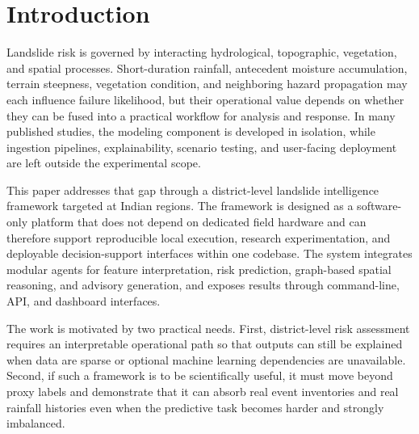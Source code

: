 \documentclass[pdflatex,sn-mathphys-num]{sn-jnl}
\begin{document}

\maketitle

\section{Introduction}

Landslide risk is governed by interacting hydrological, topographic, vegetation, and spatial processes. Short-duration rainfall, antecedent moisture accumulation, terrain steepness, vegetation condition, and neighboring hazard propagation may each influence failure likelihood, but their operational value depends on whether they can be fused into a practical workflow for analysis and response. In many published studies, the modeling component is developed in isolation, while ingestion pipelines, explainability, scenario testing, and user-facing deployment are left outside the experimental scope.

This paper addresses that gap through a district-level landslide intelligence framework targeted at Indian regions. The framework is designed as a software-only platform that does not depend on dedicated field hardware and can therefore support reproducible local execution, research experimentation, and deployable decision-support interfaces within one codebase. The system integrates modular agents for feature interpretation, risk prediction, graph-based spatial reasoning, and advisory generation, and exposes results through command-line, API, and dashboard interfaces.

The work is motivated by two practical needs. First, district-level risk assessment requires an interpretable operational path so that outputs can still be explained when data are sparse or optional machine learning dependencies are unavailable. Second, if such a framework is to be scientifically useful, it must move beyond proxy labels and demonstrate that it can absorb real event inventories and real rainfall histories even when the predictive task becomes harder and strongly imbalanced.
\end{document}

